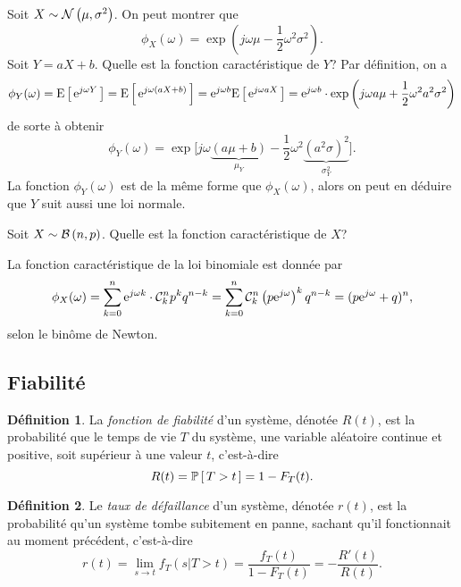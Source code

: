 \documentclass[11pt]{article}
\makeatletter
\newcommand\comb[2]{%
	\ensuremath{%
		\mathcal{C}_{#2}^{#1}%
	}%
}%
\renewcommand\P[1]{%
	\ensuremath{%
		\mathbb{P}\left[\,#1\,\right]%
	}%
}%
\newcommand\e{%
	\ensuremath{%
		\mathrm{e}%
	}%
}%
\newcommand\Bin[2]{%
	\ensuremath{%
		\mathcal{B}\left(#1,#2\right)%
	}%
}%
\newcommand\Norm[2]{%
	\ensuremath{%
		\mathcal{N}\left(#1,#2\right)%
	}%
}%
\newcommand\Esp[1]{%
	\ensuremath{%
		\mathrm{E}\left[\,#1\,\right]%
	}%
}%
\theoremstyle{remark}
\theoremstyle{definition}
\newtheorem*{@definition}{Définition}
\newenvironment{definition}{%
	\begin{@definition}%
}{%
	\end{@definition}%
	\setcounter{property}{0}%
}
\makeatother
\begin{document}
\begin{exemple}
	Soit $X\sim\Norm{\mu}{\sigma^2}$. On peut montrer que
	\begin{equation*}
		\phi_X(\omega)=\exp\left(j\omega\mu-\frac{1}{2}\omega^2\sigma^2\right).
	\end{equation*}
	Soit $Y=aX+b$. Quelle est la fonction caractéristique de $Y$?
	Par définition, on a
	\begin{equation*}
		\phi_Y(\omega)
		=\Esp{\e^{j\omega Y}}
		=\Esp{\e^{j\omega(aX+b)}}
		=\e^{j\omega b}\Esp{\e^{j\omega aX}}
		=\e^{j\omega b}\cdot\exp\left(j\omega a\mu+\frac{1}{2}
			\omega^2a^2\sigma^2
		\right)
	\end{equation*}
	de sorte à obtenir
	\begin{equation*}
		\phi_Y(\omega)=
		\exp\bigg[
			j\omega\underbrace{(a\mu+b)}_{\mu_Y}-
			\frac{1}{2}\omega^2\underbrace{(a^2\sigma)^2}_{\sigma_Y^2}
		\bigg].
	\end{equation*}
	La fonction $\phi_Y(\omega)$ est de la même forme que $\phi_X(\omega)$,
	alors on peut en déduire que $Y$ suit aussi une loi normale.
\end{exemple}

\begin{exemple}
	Soit $X\sim\Bin{n}{p}$. Quelle est la fonction caractéristique de $X$?

	La fonction caractéristique de la loi binomiale est donnée par
	\begin{equation*}
		\phi_X(\omega)
		=\sum_{k=0}^n\e^{j\omega k}\cdot\comb{n}{k}p^kq^{n-k}
		=\sum_{k=0}^n\comb{n}{k}\left(p\e^{j\omega}\right)^kq^{n-k}
		=(p\e^{j\omega}+q)^n,
	\end{equation*}
	selon le binôme de Newton.
\end{exemple}

\subsection{Fiabilité}
\begin{definition}
	La \textit{fonction de fiabilité} d'un système, dénotée $R(t)$, est la
	probabilité que le temps de vie $T$ du système, une variable aléatoire
	continue et positive, soit supérieur à une valeur $t$, c'est-à-dire
	\begin{equation*}
		R(t)=\P{T>t}=1-F_T(t).
	\end{equation*}
\end{definition}

\begin{definition}
	Le \textit{taux de défaillance} d'un système, dénotée $r(t)$, est la
	probabilité qu'un système tombe subitement en panne, sachant qu'il
	fonctionnait au moment précédent, c'est-à-dire
	\begin{equation*}
		r(t)
		=\lim_{s\rightarrow t}f_T(s|T>t)
		=\frac{f_T(t)}{1-F_T(t)}
		=-\frac{R'(t)}{R(t)}.
	\end{equation*}
\end{definition}
\end{document}
